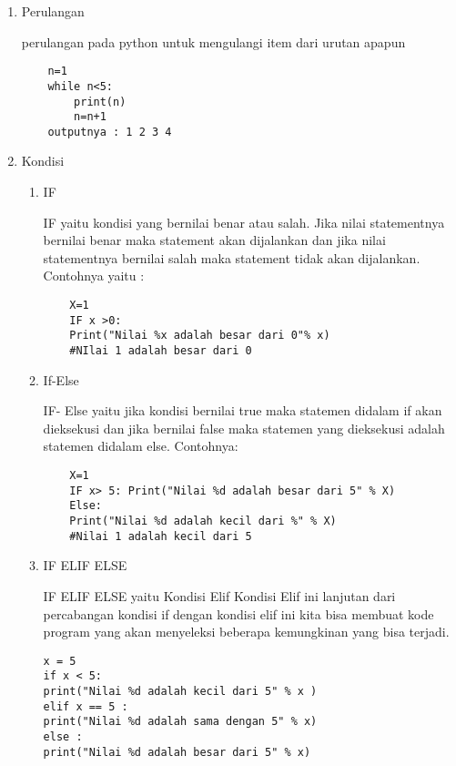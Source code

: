 \documentclass[12pt,times new roman]{article}
\begin{document}
\begin{enumerate}
\begin{verbatim}
\end{verbatim}
\item Perulangan
\par perulangan pada python untuk mengulangi item dari urutan apapun
\begin{verbatim}
	n=1
	while n<5:
		print(n)
		n=n+1
	outputnya : 1 2 3 4 
\end{verbatim}
\item Kondisi
\begin{enumerate}
\item IF
\par IF yaitu kondisi yang bernilai benar atau salah. Jika nilai statementnya bernilai benar maka statement akan dijalankan dan jika nilai statementnya bernilai salah maka statement tidak akan dijalankan. Contohnya yaitu :

\begin{verbatim}
    X=1 
    IF x >0: 
    Print("Nilai %x adalah besar dari 0"% x) 
    #NIlai 1 adalah besar dari 0

\end{verbatim}
\item If-Else 
\par IF- Else yaitu jika kondisi bernilai true maka statemen didalam if akan dieksekusi dan jika bernilai false maka statemen yang dieksekusi adalah statemen didalam else. Contohnya:
\begin{verbatim}
	X=1 
	IF x> 5: Print("Nilai %d adalah besar dari 5" % X) 
	Else: 
	Print("Nilai %d adalah kecil dari %" % X) 
	#Nilai 1 adalah kecil dari 5
\end{verbatim}
\item IF ELIF ELSE 
\par IF ELIF ELSE yaitu Kondisi Elif Kondisi Elif ini lanjutan dari percabangan kondisi if dengan kondisi elif ini kita bisa membuat kode program yang akan menyeleksi beberapa kemungkinan yang bisa terjadi. 
\begin{verbatim}
x = 5 
if x < 5: 
print("Nilai %d adalah kecil dari 5" % x ) 
elif x == 5 : 
print("Nilai %d adalah sama dengan 5" % x) 
else : 
print("Nilai %d adalah besar dari 5" % x)


\end{verbatim}
\end{enumerate}
\end{enumerate}
\end{document}
